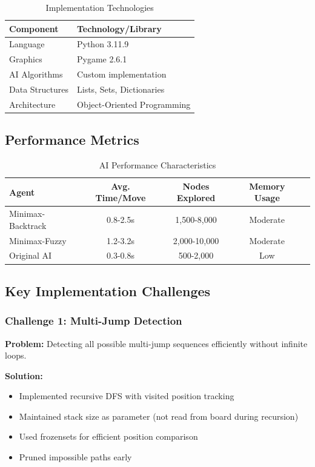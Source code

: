 \documentclass[12pt,a4paper]{article}
\begin{document}
\begin{table}[H]
\centering
\caption{Implementation Technologies}
\begin{tabular}{@{}ll@{}}
\toprule
\textbf{Component} & \textbf{Technology/Library} \\
\midrule
Language & Python 3.11.9 \\
Graphics & Pygame 2.6.1 \\
AI Algorithms & Custom implementation \\
Data Structures & Lists, Sets, Dictionaries \\
Architecture & Object-Oriented Programming \\
\bottomrule
\end{tabular}
\end{table}

\subsection{Performance Metrics}

\begin{table}[H]
\centering
\caption{AI Performance Characteristics}
\begin{tabular}{@{}lcccc@{}}
\toprule
\textbf{Agent} & \textbf{Avg. Time/Move} & \textbf{Nodes Explored} & \textbf{Memory Usage} \\
\midrule
Minimax-Backtrack & 0.8-2.5s & 1,500-8,000 & Moderate \\
Minimax-Fuzzy & 1.2-3.2s & 2,000-10,000 & Moderate \\
Original AI & 0.3-0.8s & 500-2,000 & Low \\
\bottomrule
\end{tabular}
\end{table}

\subsection{Key Implementation Challenges}

\subsubsection{Challenge 1: Multi-Jump Detection}

\textbf{Problem:} Detecting all possible multi-jump sequences efficiently without infinite loops.

\textbf{Solution:}
\begin{itemize}
    \item Implemented recursive DFS with visited position tracking
    \item Maintained stack size as parameter (not read from board during recursion)
    \item Used frozensets for efficient position comparison
    \item Pruned impossible paths early
\end{itemize}
\end{document}
